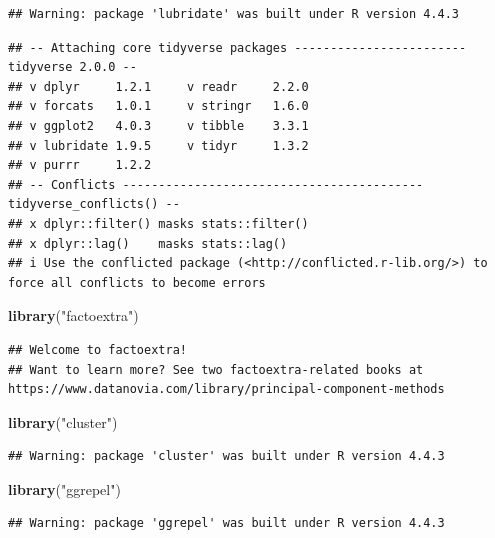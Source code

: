 \documentclass[
]{article}
\newenvironment{Shaded}{\begin{snugshade}}{\end{snugshade}}
\newcommand{\FunctionTok}[1]{\textcolor[rgb]{0.13,0.29,0.53}{\textbf{#1}}}
\newcommand{\NormalTok}[1]{#1}
\newcommand{\StringTok}[1]{\textcolor[rgb]{0.31,0.60,0.02}{#1}}
\begin{document}
\begin{verbatim}
## Warning: package 'lubridate' was built under R version 4.4.3
\end{verbatim}

\begin{verbatim}
## -- Attaching core tidyverse packages ------------------------ tidyverse 2.0.0 --
## v dplyr     1.2.1     v readr     2.2.0
## v forcats   1.0.1     v stringr   1.6.0
## v ggplot2   4.0.3     v tibble    3.3.1
## v lubridate 1.9.5     v tidyr     1.3.2
## v purrr     1.2.2     
## -- Conflicts ------------------------------------------ tidyverse_conflicts() --
## x dplyr::filter() masks stats::filter()
## x dplyr::lag()    masks stats::lag()
## i Use the conflicted package (<http://conflicted.r-lib.org/>) to force all conflicts to become errors
\end{verbatim}

\begin{Shaded}
\begin{Highlighting}[]
\FunctionTok{library}\NormalTok{(}\StringTok{"factoextra"}\NormalTok{)}
\end{Highlighting}
\end{Shaded}

\begin{verbatim}
## Welcome to factoextra!
## Want to learn more? See two factoextra-related books at https://www.datanovia.com/library/principal-component-methods
\end{verbatim}

\begin{Shaded}
\begin{Highlighting}[]
\FunctionTok{library}\NormalTok{(}\StringTok{"cluster"}\NormalTok{)}
\end{Highlighting}
\end{Shaded}

\begin{verbatim}
## Warning: package 'cluster' was built under R version 4.4.3
\end{verbatim}

\begin{Shaded}
\begin{Highlighting}[]
\FunctionTok{library}\NormalTok{(}\StringTok{"ggrepel"}\NormalTok{)}
\end{Highlighting}
\end{Shaded}

\begin{verbatim}
## Warning: package 'ggrepel' was built under R version 4.4.3
\end{verbatim}
\end{document}
